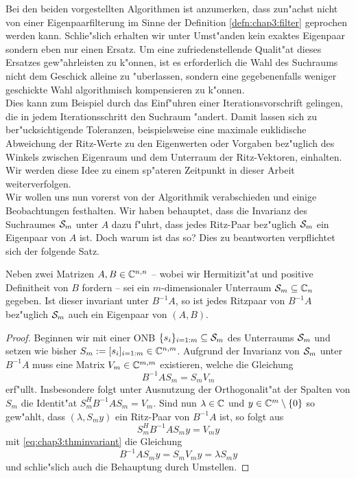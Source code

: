 Bei den beiden vorgestellten Algorithmen ist anzumerken, dass zun"achst nicht von einer Eigenpaarfilterung im Sinne der Definition \ref{defn:chap3:filter} geprochen werden kann.
Schlie"slich erhalten wir unter Umst"anden kein exaktes Eigenpaar sondern eben nur einen Ersatz.
Um eine zufriedenstellende Qualit"at dieses Ersatzes gew"ahrleisten zu k"onnen, ist es erforderlich die Wahl des Suchraums nicht dem Geschick alleine zu "uberlassen, sondern eine gegebenenfalls weniger geschickte Wahl algorithmisch kompensieren zu k"onnen.\\

Dies kann zum Beispiel durch das Einf"uhren einer Iterationsvorschrift gelingen, die in jedem Iterationsschritt den Suchraum "andert.
Damit lassen sich zu ber"ucksichtigende Toleranzen, beispielsweise eine maximale euklidische Abweichung der Ritz-Werte zu den Eigenwerten oder Vorgaben bez"uglich des Winkels zwischen Eigenraum und dem Unterraum der Ritz-Vektoren, einhalten.
Wir werden diese Idee zu einem sp"ateren Zeitpunkt in dieser Arbeit weiterverfolgen.\\

Wir wollen uns nun vorerst von der Algorithmik verabschieden und einige Beobachtungen
festhalten. Wir haben behauptet, dass die Invarianz des Suchraumes $\S_m$ unter
$A$ dazu f"uhrt, dass jedes Ritz-Paar bez"uglich $\S_m$ ein Eigenpaar von $A$ ist.
Doch warum ist das so? Dies zu beantworten verpflichtet sich der folgende Satz.

\newpage

\begin{thm}\label{thm:chap3:invariant}
Neben zwei Matrizen $A,B\in\Cnn$ -- wobei wir Hermitizit"at und positive Definitheit von $B$ fordern -- sei ein $m$-dimensionaler Unterraum $\S_m \subseteq \C_n$ gegeben.
Ist dieser invariant unter $B^{-1}A$, so ist jedes Ritzpaar von $B^{-1}A$
bez"uglich $\S_m$ auch ein Eigenpaar von $(A,B)$.
\end{thm}

\begin{proof}
Beginnen wir mit einer ONB $\{s_i\}_{i=1:m}\subseteq\S_m$ des Unterraums $\S_m$
und setzen wie bisher $S_m := [s_i]_{i=1:m}\in\C^{n,m}$. Aufgrund der Invarianz
von $\S_m$ unter $B^{-1}A$ muss eine Matrix $V_m \in \C^{m,m}$ existieren, welche
die Gleichung
\begin{equation}\label{eq:chap3:thminvariant}
B^{-1}A S_m = S_m V_m
\end{equation}
erf"ullt. Insbesondere folgt unter Ausnutzung der Orthogonalit"at der Spalten
von $S_m$ die Identit"at $S_m^H B^{-1}A S_m = V_m$.
Sind nun $\lambda\in\C$ und $y\in\C^m\setminus\{0\}$ so gew"ahlt, dass $(\lambda, S_m y)$
ein Ritz-Paar von $B^{-1}A$ ist, so folgt aus
\[
S_m^H B^{-1}A S_m y = V_m y
\]
mit \eqref{eq:chap3:thminvariant} die Gleichung
\[
B^{-1}AS_m y = S_m V_m y = \lambda S_m y
\]
und schlie"slich auch die Behauptung durch Umstellen.
\end{proof}

